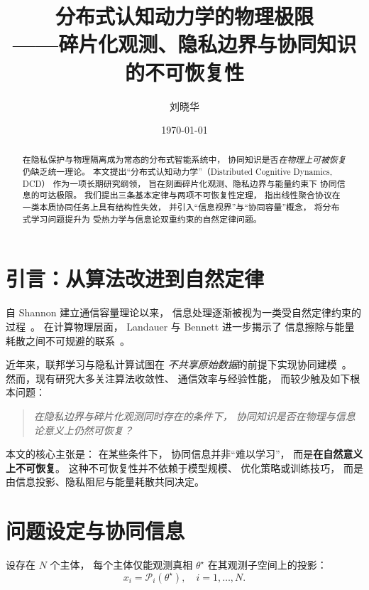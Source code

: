 \documentclass[11pt,a4paper]{article}
\title{\Huge\bfseries
分布式认知动力学的物理极限\\[0.6em]
\Large
——碎片化观测、隐私边界与协同知识的不可恢复性
}
\author{\Large 刘晓华}
\date{\Large \today}
\newcommand{\thetaGT}{\theta^{\star}}
\newcommand{\proj}{\mathcal{P}}
\begin{document}
\maketitle

\begin{abstract}
\noindent
在隐私保护与物理隔离成为常态的分布式智能系统中，
协同知识是否\emph{在物理上可被恢复}仍缺乏统一理论。
本文提出“分布式认知动力学”（Distributed Cognitive Dynamics, DCD）
作为一项长期研究纲领，
旨在刻画碎片化观测、隐私边界与能量约束下
协同信息的可达极限。
我们提出三条基本定律与两项不可恢复性定理，
指出线性聚合协议在一类本质协同任务上具有结构性失效，
并引入“信息视界”与“协同容量”概念，
将分布式学习问题提升为
受热力学与信息论双重约束的自然定律问题。
\end{abstract}

\section{引言：从算法改进到自然定律}

自 Shannon 建立通信容量理论以来，
信息处理逐渐被视为一类受自然定律约束的过程~\cite{shannon1948}。
在计算物理层面，
Landauer 与 Bennett 进一步揭示了
信息擦除与能量耗散之间不可规避的联系~\cite{landauer1961irreversibility,bennett1982thermodynamics}。

近年来，联邦学习与隐私计算试图在
\emph{不共享原始数据}的前提下实现协同建模~\cite{mcmahan2017communication}。
然而，现有研究大多关注算法收敛性、
通信效率与经验性能，
而较少触及如下根本问题：

\begin{quote}
\emph{在隐私边界与碎片化观测同时存在的条件下，
协同知识是否在物理与信息论意义上仍然可恢复？}
\end{quote}

本文的核心主张是：
在某些条件下，
协同信息并非“难以学习”，
而是\textbf{在自然意义上不可恢复}。
这种不可恢复性并不依赖于模型规模、
优化策略或训练技巧，
而是由信息投影、隐私阻尼与能量耗散共同决定。

\section{问题设定与协同信息}

设存在 $N$ 个主体，
每个主体仅能观测真相 $\thetaGT$ 在其观测子空间上的投影：
\[
x_i = \proj_i(\thetaGT), \quad i=1,\dots,N.
\]
\end{document}
